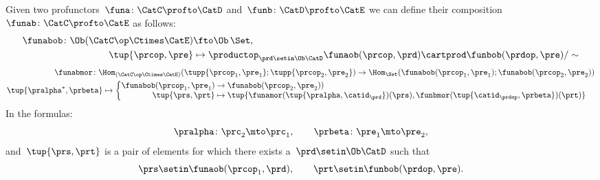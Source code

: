 \begin{widepar}
    \begin{ctdefinition}
        \label{def:profunctor-composition}
        Given two profunctors~$\funa\colon \CatC \profto \CatD$ and~$\funb\colon \CatD \profto \CatE$
        we can define their composition~$\funab\colon \CatC \profto \CatE$ as follows:
        \begin{equation}
            \begin{aligned}
                \funabob \colon \Ob(\CatC\op \Ctimes \CatE) & \fto  \Ob\, \Set, \\
                \tup{\prcop, \pre}                          & \mapsto \productop_{\prd\setin\Ob \CatD} \funaob(\prcop, \prd) \cartprod \funbob(\prdop, \pre) / \sim
            \end{aligned}
        \end{equation}
        \begin{equation}
            \begin{aligned}
                \funabmor  \colon \Hom_{(\CatC\op \Ctimes \CatE)}( \tupp{\prcop_1, \pre_1}; \tupp{\prcop_2, \pre_2}) \to \Hom_{\Set}( \funabob(\prcop_1, \pre_1); \funabob(\prcop_2, \pre_2)) \\
                \tup{\pralpha^\ast, \prbeta} \mapsto  \begin{cases}
                                                          \begin{aligned}
                        \funabob(\prcop_1, \pre_1) & \to   \funabob(\prcop_2, \pre_2)) \\
                        \tup{\prs, \prt}           & \mapsto  \tup{
                            \funamor(\tup{\pralpha, \catid_{\prd}})(\prs),
                            \funbmor(\tup{\catid_{\prdop}, \prbeta})(\prt)}
                    \end{aligned}
                                                      \end{cases}
            \end{aligned}
        \end{equation}
        In the formulas:
        \begin{equation}
            \pralpha\colon \prc_2 \mto \prc_1, \qquad
            \prbeta\colon \pre_1 \mto \pre_2,
        \end{equation}
        and~$\tup{\prs, \prt}$ is a pair of elements for which there exists a~$\prd\setin\Ob \CatD$ such that
        \begin{equation}
            \prs \setin \funaob(\prcop_1, \prd), \qquad\prt \setin \funbob(\prdop, \pre).
        \end{equation}
    \end{ctdefinition}
\end{widepar}


